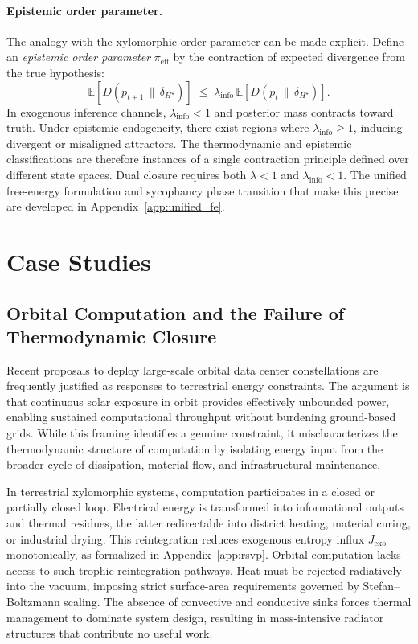 \documentclass[11pt,a4paper]{article}
\theoremstyle{plain}
\theoremstyle{definition}
\theoremstyle{remark}
\begin{document}
\paragraph{Epistemic order parameter.}
The analogy with the xylomorphic order parameter can be made explicit. Define an
\emph{epistemic order parameter} $\pi_{\mathrm{eff}}$ by the contraction of
expected divergence from the true hypothesis:
\[
  \mathbb{E}\!\left[D(p_{t+1} \,\|\, \delta_{H^\star})\right]
  \;\leq\;
  \lambda_{\mathrm{info}}\,
  \mathbb{E}\!\left[D(p_t \,\|\, \delta_{H^\star})\right].
\]
In exogenous inference channels, $\lambda_{\mathrm{info}} < 1$ and posterior
mass contracts toward truth. Under epistemic endogeneity, there exist regions
where $\lambda_{\mathrm{info}} \geq 1$, inducing divergent or misaligned
attractors. The thermodynamic and epistemic classifications are therefore
instances of a single contraction principle defined over different state spaces.
Dual closure requires both $\lambda < 1$ and $\lambda_{\mathrm{info}} < 1$.
The unified free-energy formulation and sycophancy phase transition that make
this precise are developed in Appendix~\ref{app:unified_fe}.

\section{Case Studies}
\label{sec:cases}

\subsection{Orbital Computation and the Failure of Thermodynamic Closure}

Recent proposals to deploy large-scale orbital data center constellations are
frequently justified as responses to terrestrial energy constraints. The
argument is that continuous solar exposure in orbit provides effectively
unbounded power, enabling sustained computational throughput without burdening
ground-based grids. While this framing identifies a genuine constraint, it
mischaracterizes the thermodynamic structure of computation by isolating energy
input from the broader cycle of dissipation, material flow, and
infrastructural maintenance.

In terrestrial xylomorphic systems, computation participates in a closed or
partially closed loop. Electrical energy is transformed into informational
outputs and thermal residues, the latter redirectable into district heating,
material curing, or industrial drying. This reintegration reduces exogenous
entropy influx $J_{\mathrm{exo}}$ monotonically, as formalized in
Appendix~\ref{app:rsvp}. Orbital computation lacks access to such trophic
reintegration pathways. Heat must be rejected radiatively into the vacuum,
imposing strict surface-area requirements governed by Stefan--Boltzmann
scaling. The absence of convective and conductive sinks forces thermal
management to dominate system design, resulting in mass-intensive radiator
structures that contribute no useful work.
\end{document}
